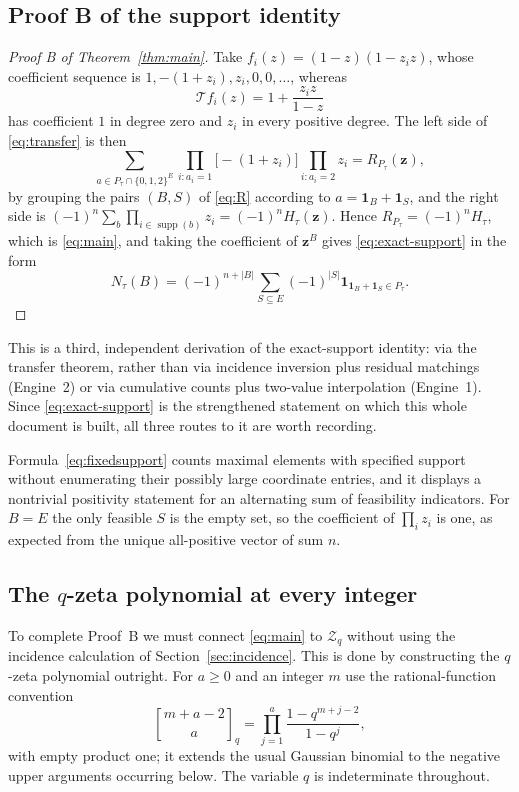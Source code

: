 \documentclass[11pt]{article}
\numberwithin{equation}{section}
\theoremstyle{definition}
\theoremstyle{remark}
\newcommand{\one}{\mathbf 1}
\newcommand{\supp}{\operatorname{supp}}
\newcommand{\Tr}{\mathcal T}
\newcommand{\Zeta}{\mathcal Z}
\newcommand{\zt}[1]{\mathbf z^{#1}}
\newcommand{\qbinom}[2]{\genfrac{[}{]}{0pt}{}{#1}{#2}_{q}}
\begin{document}
\subsection{Proof B of the support identity}
\label{sec:proofB-support}

\begin{proof}[Proof B of Theorem~\ref{thm:main}]
Take $f_i(z)=(1-z)(1-z_iz)$, whose coefficient sequence is
$1,-(1+z_i),z_i,0,0,\ldots$, whereas
\[
 \Tr f_i(z)=1+\frac{z_iz}{1-z}
\]
has coefficient $1$ in degree zero and $z_i$ in every positive degree. The
left side of \eqref{eq:transfer} is then
\[
 \sum_{a\in P_\tau\cap\{0,1,2\}^E}
 \prod_{i:a_i=1}\bigl[-(1+z_i)\bigr]\prod_{i:a_i=2}z_i
 =R_{P_\tau}(\mathbf z),
\]
by grouping the pairs $(B,S)$ of \eqref{eq:R} according to
$a=\one_B+\one_S$, and the right side is
$(-1)^n\sum_{b}\prod_{i\in\supp(b)}z_i=(-1)^nH_\tau(\mathbf z)$. Hence
$R_{P_\tau}=(-1)^nH_\tau$, which is \eqref{eq:main}, and taking the
coefficient of $\zt B$ gives \eqref{eq:exact-support} in the form
\begin{equation}
 N_\tau(B)
 =(-1)^{n+|B|}\sum_{S\subseteq E}(-1)^{|S|}
       \mathbf 1_{\one_B+\one_S\in P_\tau}.
 \label{eq:fixedsupport}
\end{equation}
\end{proof}

This is a third, independent derivation of the exact-support identity: via
the transfer theorem, rather than via incidence inversion plus residual
matchings (Engine~2) or via cumulative counts plus two-value interpolation
(Engine~1). Since \eqref{eq:exact-support} is the strengthened statement on
which this whole document is built, all three routes to it are worth
recording.

Formula~\eqref{eq:fixedsupport} counts maximal elements with specified support
without enumerating their possibly large coordinate entries, and it displays a
nontrivial positivity statement for an alternating sum of feasibility
indicators. For $B=E$ the only feasible $S$ is the empty set, so the
coefficient of $\prod_iz_i$ is one, as expected from the unique all-positive
vector of sum $n$.

\subsection{The \texorpdfstring{$q$}{q}-zeta polynomial at every integer}
\label{sec:endpoint}

To complete Proof~B we must connect \eqref{eq:main} to $\Zeta_q$ without using
the incidence calculation of Section~\ref{sec:incidence}. This is done by
constructing the $q$-zeta polynomial outright. For $a\ge0$ and an integer $m$
use the rational-function convention
\begin{equation}
 \qbinom{m+a-2}{a}=\prod_{j=1}^a\frac{1-q^{m+j-2}}{1-q^j},
 \label{eq:gaussian}
\end{equation}
with empty product one; it extends the usual Gaussian binomial to the negative
upper arguments occurring below. The variable $q$ is indeterminate throughout.
\end{document}
